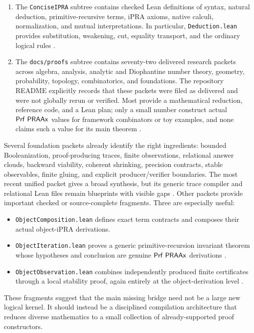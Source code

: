 \begin{enumerate}
\item The \texttt{ConciseIPRA} subtree contains checked Lean definitions of syntax, natural deduction, primitive-recursive terms, iPRA axioms, native calculi, normalization, and mutual interpretations.  In particular, \texttt{Deduction.lean} provides substitution, weakening, cut, equality transport, and the ordinary logical rules \cite{repo-deduction}.
\item The \texttt{docs/proofs} subtree contains seventy-two delivered research packets across algebra, analysis, analytic and Diophantine number theory, geometry, probability, topology, combinatorics, and foundations.  The repository README explicitly records that these packets were filed as delivered and were not globally rerun or verified.  Most provide a mathematical reduction, reference code, and a Lean plan; only a small number construct actual \(\mathsf{Prf}\ \mathsf{PRAAx}\) values for framework combinators or toy examples, and none claims such a value for its main theorem \cite{repo-pra-readme}.
\end{enumerate}

Several foundation packets already identify the right ingredients: bounded Booleanization, proof-producing traces, finite observations, relational answer clouds, backward viability, coherent shrinking, precision contracts, stable observables, finite gluing, and explicit producer/verifier boundaries.  The most recent unified packet gives a broad synthesis, but its generic trace compiler and relational Lean files remain blueprints with visible gaps \cite{repo-unified}.  Other packets provide important checked or source-complete fragments.  Three are especially useful:

\begin{itemize}
\item \texttt{ObjectComposition.lean} defines exact term contracts and composes their actual object-iPRA derivations.
\item \texttt{ObjectIteration.lean} proves a generic primitive-recursion invariant theorem whose hypotheses and conclusion are genuine \(\mathsf{Prf}\ \mathsf{PRAAx}\) derivations \cite{repo-local-global}.
\item \texttt{ObjectObservation.lean} combines independently produced finite certificates through a local stability proof, again entirely at the object-derivation level \cite{repo-observable}.
\end{itemize}

These fragments suggest that the main missing bridge need not be a large new logical kernel.  It should instead be a disciplined compilation architecture that reduces diverse mathematics to a small collection of already-supported proof constructors.

